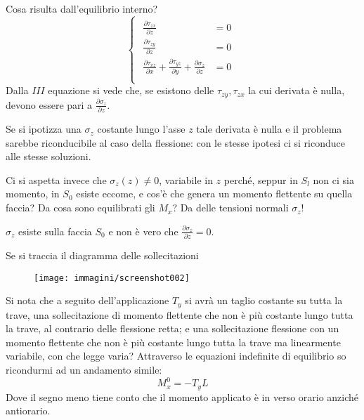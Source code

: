 \documentclass{article}
\begin{document}
\begin{adjustwidth}{2in}{}
		Cosa risulta dall'equilibrio interno?
		\[
		\begin{cases}
			\begin{aligned}
				\frac{\partial \tau_{zx}}{\partial z} & =0 \\
				
				\frac{\partial \tau_{zy}}{\partial z} & =0 \\
				
				\frac{\partial \tau_{xz}}{\partial x} + \frac{\partial \tau_{yz}}{\partial y} + \frac{\partial\sigma_z}{\partial z} & =0 \\
			\end{aligned}
		\end{cases}
		\]
		Dalla $III$ equazione si vede che, se esistono delle $\tau_{zy}, \tau_{zx}$ la cui derivata è nulla, devono essere pari a \(\frac{\partial\sigma_z}{\partial z}\).
		
		Se si ipotizza una $\sigma_z$ costante lungo l'asse $z$ tale derivata è nulla e il problema sarebbe riconducibile al caso della flessione: con le stesse ipotesi ci si riconduce alle stesse soluzioni. 
		
		Ci si aspetta invece che $\sigma_z(z)\neq0$, variabile in $z$ perché, seppur in $S_l$ non ci sia momento, in $S_0$ esiste eccome, e cos'è che genera un momento flettente su quella faccia? Da cosa sono equilibrati gli $M_x$? Da delle tensioni normali $\sigma_z$!
		
		$\sigma_z$ esiste sulla faccia $S_0$ e non è vero che \(\frac{\partial\sigma_z}{\partial z} = 0\). \newline 
		
		Se si traccia il diagramma delle sollecitazioni
		
		
\begin{figure}[H]
	\centering
	\texttt{[image: immagini/screenshot002]}
	\label{fig:screenshot002}
\end{figure}

		Si nota che a seguito dell'applicazione $T_y$ si avrà un taglio costante su tutta la trave, una sollecitazione di momento flettente che non è più costante lungo tutta la trave, al contrario delle flessione retta; e una sollecitazione flessione con un momento flettente che non è più costante lungo tutta la trave ma linearmente variabile, con che legge varia? Attraverso le equazioni indefinite di equilibrio so ricondurmi ad un andamento simile:
		\[M^0_x=-T_yL\]
		Dove il segno meno tiene conto che il momento applicato è in verso orario anziché antiorario. \newline 
		

\end{adjustwidth}
\end{document}
